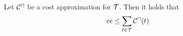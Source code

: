 \begin{theorem}
	Let ${\mathcal{C}^\sqcap}$ be a cost approximation for $\mathcal{T}$.
	Then it holds that 
	\[ \text{cc} \leq \sum_{t \in \mathcal{T}} {\mathcal{C}^\sqcap}(t) \]
\end{theorem}
